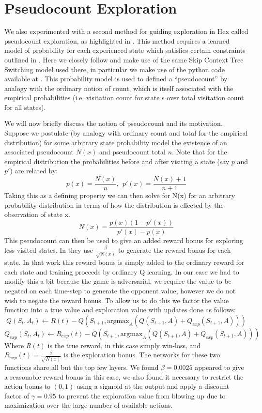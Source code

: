 \documentclass{article}
\begin{document}
\section*{Pseudocount Exploration}
We also experimented with a second method for guiding exploration in Hex called pseudocount exploration, as highlighted in \cite{pseudocounts}. This method requires a learned model of probability for each experienced state which satisfies certain constraints outlined in \cite{pseudocounts}. Here we closely follow \cite{pseudocounts} and make use of the same Skip Context Tree Switching \cite{SCTS} model used there, in particular we make use of the python code available at \cite{SCTS_code}. This probability model is used to defined a ``pseudocount'' by analogy with the ordinary notion of count, which is itself associated with the empirical probabilities (i.e. visitation count for state s over total visitation count for all states).

We will now briefly discuss the notion of pseudocount and its motivation. Suppose we postulate (by analogy with ordinary count and total for the empirical distribution) for some arbitrary state probability model the existence of an associated pseudocount $N(x)$ and pseudocount total $n$. Note that for the empirical distribution the probabilities before and after visiting a state (say $p$ and $p'$) are related by:
$$p(x)=\frac{N(x)}{n},\ \ p'(x)=\frac{N(x)+1}{n+1}$$
Taking this as a defining property we can then solve for N(x) for an arbitrary probability distribution in terms of how the distribution is effected by the observation of state x.
$$N(x)=\frac{p(x)(1-p'(x))}{p'(x)-p(x)}$$
This pseudocount can then be used to give an added reward bonus for exploring less visited states. In \cite{pseudocounts} they use $\frac{\beta}{\sqrt{N(x)}}$ to generate the reward bonus for each state. In that work this reward bonus is simply added to the ordinary reward for each state and training proceeds by ordinary Q learning. In our case we had to modify this a bit because the game is adversarial, we require the value to be negated on each time-step to generate the opponent value, however we do not wish to negate the reward bonus. To allow us to do this we factor the value function into a true value and exploration value with updates done as follows:
$$Q(S_t,A_t) \leftarrow R(t) - Q(S_{t+1}, \text{argmax}_A(Q(S_{t+1}, A)+Q_{exp}(S_{t+1},A)))$$
$$Q_{exp}(S_t,A_t) \leftarrow R_{exp}(t) - Q(S_{t+1}, \text{argmax}_A(Q(S_{t+1}, A)+Q_{exp}(S_{t+1},A)))$$
Where $R(t)$ is the true reward, in this case simply win-loss, and $R_{exp}(t)=\frac{\beta}{\sqrt{N(x)}}$ is the exploration bonus. The networks for these two functions share all but the top few layers. We found $\beta=0.0025$ appeared to give a reasonable reward bonus in this case, we also found it necessary to restrict the action bonus to $(0,1)$ using a sigmoid at the output and apply a discount factor of $\gamma=0.95$ to prevent the exploration value from blowing up due to maximization over the large number of available actions.
\end{document}
